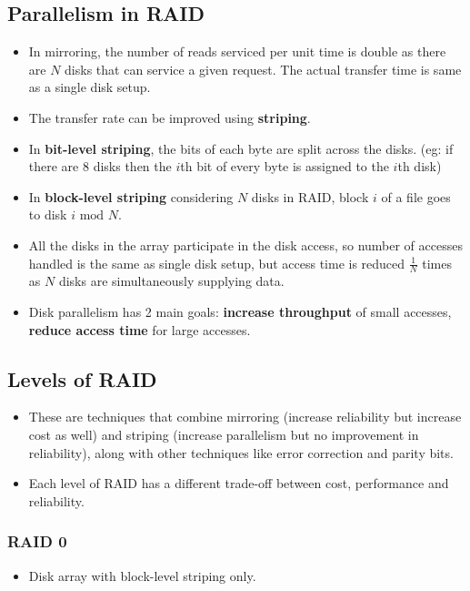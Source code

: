 \documentclass{article}
\theoremstyle{plain}
\theoremstyle{definition}
\begin{document}
\subsection{Parallelism in RAID}
\begin{itemize}
    \item In mirroring, the number of reads serviced per unit time is double as there are $N$ disks that can service a given request. The actual transfer time is same as a single disk setup. 
    
    \item The transfer rate can be improved using \textbf{striping}. 
    
    \item In \textbf{bit-level striping}, the bits of each byte are split across the disks. (eg: if there are 8 disks then the $i$th bit of every byte is assigned to the $i$th disk)
    
    \item In \textbf{block-level striping} considering $N$ disks in RAID, block $i$ of a file goes to disk $i\text{ mod }N$. 
    
    \item All the disks in the array participate in the disk access, so number of accesses handled is the same as single disk setup, but access time is reduced $\frac{1}{N}$ times as $N$ disks are simultaneously supplying data.  
    
    \item Disk parallelism has 2 main goals: \textbf{increase throughput} of small accesses, \textbf{reduce access time} for large accesses. 
\end{itemize}

\subsection{Levels of RAID}
\begin{itemize}
    \item These are techniques that combine mirroring (increase reliability but increase cost as well) and striping (increase parallelism but no improvement in reliability), along with other techniques like error correction and parity bits. 
    
    \item Each level of RAID has a different trade-off between cost, performance and reliability.
\end{itemize}

\subsubsection{RAID 0}
\begin{itemize}
    \item Disk array with block-level striping only.
\end{itemize}
\end{document}
